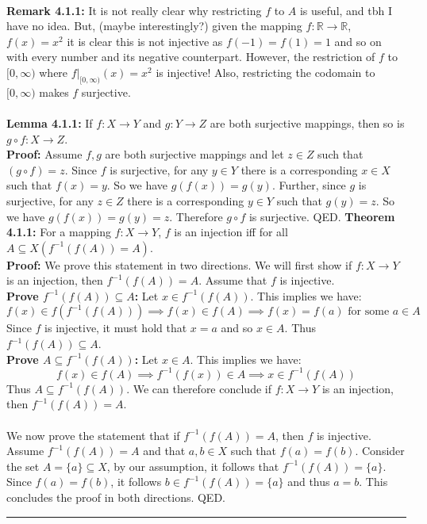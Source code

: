 \documentclass[11pt]{article}
\begin{document}
\vspace{0.1cm} \\
\textbf{Remark 4.1.1:} It is not really clear why restricting $f$ to $A$ is useful, and tbh I have no idea. But, (maybe interestingly?) given the mapping $f : \mathbb{R} \rightarrow \mathbb{R}$, $f(x)=x^{2}$ it is clear this is not injective as $f(-1)=f(1)=1$ and so on with every number and its negative counterpart. However, the restriction of $f$ to $[0,\infty)$ where $f|_{[0,\infty)}(x)=x^{2}$ is injective! Also, restricting the codomain to $[0,\infty)$ makes $f$ surjective. \\
\vspace{0.1cm} \\
\textbf{Lemma 4.1.1:} If $f : X \rightarrow Y$ and $g : Y \rightarrow Z$ are both surjective mappings, then so is $g \circ f : X \rightarrow Z$. \\
\textbf{Proof:} Assume $f,g$ are both surjective mappings and let $z \in Z$ such that $(g \circ f)=z$. Since $f$ is surjective, for any $y \in Y$ there is a corresponding $x \in X$ such that $f(x)=y$. So we have $g(f(x))=g(y)$. Further, since $g$ is surjective, for any $z \in Z$ there is a corresponding $y \in Y$ such that $g(y)=z$. So we have $g(f(x))=g(y)=z$. Therefore $g \circ f$ is surjective. QED. 
\newpage
\textbf{Theorem 4.1.1:} For a mapping $f : X \rightarrow Y$, $f$ is an injection iff for all $A \subseteq X (f^{-1}(f(A))=A)$. \\
\textbf{Proof:} We prove this statement in two directions. We will first show if $f : X \rightarrow Y$ is an injection, then $f^{-1}(f(A))=A$. Assume that $f$ is injective. \\
\textbf{Prove $f^{-1}(f(A)) \subseteq A$:} Let $x \in f^{-1}(f(A))$. This implies we have:
\begin{equation*}
    f(x) \in f(f^{-1}(f(A))) \implies f(x) \in f(A) \implies f(x)=f(a) \text{ for some } a \in A
\end{equation*}
Since $f$ is injective, it must hold that $x=a$ and so $x \in A$. Thus $f^{-1}(f(A)) \subseteq A$. \\
\textbf{Prove $A \subseteq f^{-1}(f(A))$:} Let $x \in A$. This implies we have:
\begin{equation*}
    f(x) \in f(A) \implies f^{-1}(f(x)) \in A \implies x \in f^{-1}(f(A))
\end{equation*}
Thus $A \subseteq f^{-1}(f(A))$. We can therefore conclude if $f : X \rightarrow Y$ is an injection, then $f^{-1}(f(A))=A$.\\
\vspace{0.1cm} \\
We now prove the statement that if $f^{-1}(f(A))=A$, then $f$ is injective. Assume $f^{-1}(f(A))=A$ and that $a,b \in X$ such that $f(a)=f(b)$. Consider the set $A = \{a\} \subseteq X$, by our assumption, it follows that $f^{-1}(f(A))=\{a\}$. Since $f(a)=f(b)$, it follows $b \in f^{-1}(f(A))=\{a\}$ and thus $a=b$. This concludes the proof in both directions. QED. \\
\noindent\rule{\textwidth}{1pt}
\end{document}
